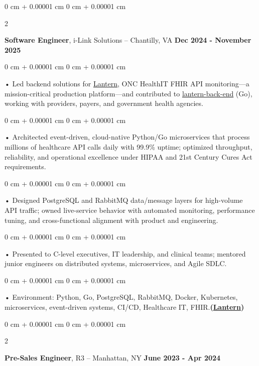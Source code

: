 \documentclass[10pt, letterpaper]{article}
\newenvironment{onecolentry}{
    \begin{adjustwidth}{
        0 cm + 0.00001 cm
    }{
        0 cm + 0.00001 cm
    }
}{
    \end{adjustwidth}
} %
\newenvironment{twocolentry}[2][]{
    \onecolentry
    \def\secondColumn{#2}
    \setcolumnwidth{\fill, 4.5 cm}
    \begin{paracol}{2}
}{
    \switchcolumn \raggedleft \secondColumn
    \end{paracol}
    \endonecolentry
} %
\begin{document}
        \vspace{0.1cm}

        \begin{twocolentry}{
            \textbf{Dec 2024 - November 2025}
        }
            \textbf{Software Engineer}, i-Link Solutions -- Chantilly, VA\end{twocolentry}


        \begin{onecolentry}
             • Led backend solutions for \href{https://lantern.healthit.gov/?tab=dashboard_tab}{Lantern}, ONC HealthIT FHIR API monitoring---a mission-critical production platform---and contributed to \href{https://github.com/onc-healthit/lantern-back-end}{lantern-back-end} (Go), working with providers, payers, and government health agencies.
        \end{onecolentry}
        \begin{onecolentry}
             • Architected event-driven, cloud-native Python/Go microservices that process millions of healthcare API calls daily with 99.9\% uptime; optimized throughput, reliability, and operational excellence under HIPAA and 21st Century Cures Act requirements.
        \end{onecolentry}
        \begin{onecolentry}
             • Designed PostgreSQL and RabbitMQ data/message layers for high-volume API traffic; owned live-service behavior with automated monitoring, performance tuning, and cross-functional alignment with product and engineering.
        \end{onecolentry}
        \begin{onecolentry}
             • Presented to C-level executives, IT leadership, and clinical teams; mentored junior engineers on distributed systems, microservices, and Agile SDLC.
        \end{onecolentry}
        \begin{onecolentry}
             • Environment: Python, Go, PostgreSQL, RabbitMQ, Docker, Kubernetes, microservices, event-driven systems, CI/CD, Healthcare IT, FHIR.\textbf{(\href{https://lantern.healthit.gov/?tab=dashboard_tab}{Lantern})}
        \end{onecolentry}
        \vspace{0.1cm}

        \begin{twocolentry}{
            \textbf{June 2023 - Apr 2024}
        }
            \textbf{Pre-Sales Engineer}, R3 -- Manhattan, NY\end{twocolentry}
\end{document}
